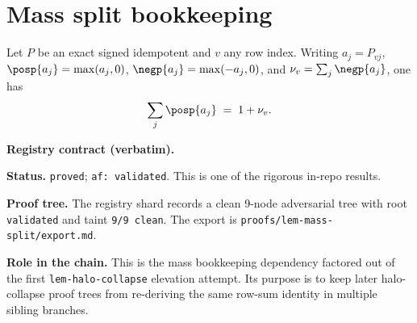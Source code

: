 \section{Mass split bookkeeping}\label{sec:mass-split}

\begin{lemma}\label{lem:mass-split}
Let $P$ be an exact signed idempotent and $v$ any row index. Writing
$a_j=P_{vj}$, $\posp{a_j}=\max(a_j,0)$, $\negp{a_j}=\max(-a_j,0)$, and
$\nu_v=\sum_j\negp{a_j}$, one has
\[
  \sum_j\posp{a_j}\;=\;1+\nu_v.
\]
\end{lemma}

\noindent\textbf{Registry contract (verbatim).}

\noindent\textbf{Status.} \texttt{proved}; \texttt{af: validated}.
This is one of the rigorous in-repo results.

\noindent\textbf{Proof tree.} The registry shard records a clean
9-node adversarial tree with root \texttt{validated} and taint
\texttt{9/9 clean}.  The export is
\texttt{proofs/lem-mass-split/export.md}.

\noindent\textbf{Role in the chain.} This is the mass bookkeeping
dependency factored out of the first \texttt{lem-halo-collapse}
elevation attempt.  Its purpose is to keep later halo-collapse proof
trees from re-deriving the same row-sum identity in multiple sibling
branches.
